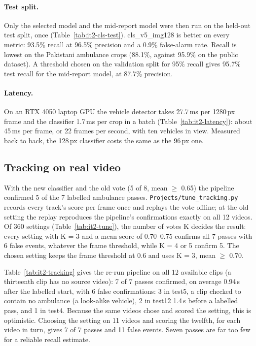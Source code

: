 \paragraph{Test split.} Only the selected model and the mid-report model were then run on the held-out test split,
once (Table~\ref{tab:it2-cls-test}). cls\_v5\_img128 is better on every metric: 93.5\% recall at 96.5\% precision
and a 0.9\% false-alarm rate. Recall is lowest on the Pakistani ambulance crops (88.1\%, against 95.9\% on the
public dataset). A threshold chosen on the validation split for 95\% recall gives 95.7\% test recall for the
mid-report model, at 87.7\% precision.

\paragraph{Latency.} On an RTX 4050 laptop GPU the vehicle detector takes 27.7\,ms per 1280\,px frame and the
classifier 1.7\,ms per crop in a batch (Table~\ref{tab:it2-latency}): about 45\,ms per frame, or 22 frames per
second, with ten vehicles in view. Measured back to back, the 128\,px classifier costs the same as the 96\,px one.

\subsection{Tracking on real video}
\label{sec:it2-tracking}
With the new classifier and the old vote (5 of 8, mean $\geq$ 0.65) the pipeline confirmed 5 of the 7 labelled
ambulance passes. \texttt{Projects/tune\_tracking.py} records every track's score per frame once and replays the
vote offline; at the old setting the replay reproduces the pipeline's confirmations exactly on all 12 videos.
Of 360 settings (Table~\ref{tab:it2-tune}), the number of votes K decides the result: every setting with K = 3
and a mean score of 0.70--0.75 confirms all 7 passes with 6 false events, whatever the frame threshold, while
K = 4 or 5 confirm 5. The chosen setting keeps the frame threshold at 0.6 and uses K = 3, mean $\geq$ 0.70.

Table~\ref{tab:it2-tracking} gives the re-run pipeline on all 12 available clips (a thirteenth clip has no source
video): 7 of 7 passes confirmed, on average 0.94\,s after the labelled start, with 6 false confirmations: 3 in
test5, a clip checked to contain no ambulance (a look-alike vehicle), 2 in test12 1.4\,s before a labelled pass,
and 1 in test4. Because the same videos chose and scored the setting, this is optimistic. Choosing the setting on
11 videos and scoring the twelfth, for each video in turn, gives 7 of 7 passes and 11 false events. Seven passes
are far too few for a reliable recall estimate.

